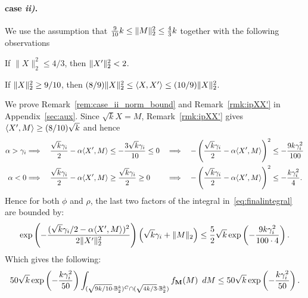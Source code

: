 \paragraph{case \textit{ii)}.}
We use the assumption that $\frac{9}{10}k\le\norm{M}_2^2\le \frac{4}{3}k$ together with the following observations
\begin{remark}\label{rem:case_ii_norm_bound}
   If $\|X\|_2^2 \leq 4/3$, then $\norm{X'}_2^2 < 2$.
\end{remark}
\begin{remark}\label{rmk:ipXX'}
    If $\norm{X}_2^2\ge 9/10$, then $(8/9)\norm{X}_2^2\le \ipr{X,X'}\le (10/9)\norm{X}_2^2$.
\end{remark}
We prove Remark~\ref{rem:case_ii_norm_bound} and Remark~\ref{rmk:ipXX'} in Appendix~\ref{sec:aux}.
Since $\sqrt{k}X = M$, Remark~\ref{rmk:ipXX'} gives $\langle X',M\rangle\ge (8/10) \sqrt{k}$ 
and hence
\begin{alignat*}{3}
    \alpha > \gamma_i 
    &\Longrightarrow\quad  \frac{\sqrt{k}\gamma_i}{2} - \alpha\langle X',M\rangle
    \le-\frac{3\sqrt{k}\gamma_i}{10}
    \le 0
    &&\Longrightarrow\quad 
    -\left(\frac{\sqrt{k}\gamma_i}{2} - \alpha\langle X',M\rangle\right)^2
    \le -\frac{9k\gamma_i^2}{100}\\
    \alpha < 0 
    &\Longrightarrow\quad
    \frac{\sqrt{k}\gamma_i}{2} - \alpha\langle X',M\rangle 
    \ge\frac{\sqrt{k}\gamma_i}{2}
    \ge 0 
    &&\Longrightarrow\quad
    -\left(\frac{\sqrt{k}\gamma_i}{2} - \alpha\langle X',M\rangle\right)^2
    \le -\frac{k\gamma_i^2}{4}.
\end{alignat*}
Hence for both $\phi$ and $\rho$, the last two factors of the integral in~\eqref{eq:finalintegral} are bounded by:
\begin{align*}
\exp\left(-\frac{(\sqrt{k}\gamma_i/2 - \alpha\ipr{X',M})^2}{2\norm{X'}_2^2}\right)\left(\sqrt{k}\gamma_i + \norm{M}_2 \right)
\le\frac{5}{2}\sqrt{k}\exp\left(-\frac{9 k\gamma_i^2}{100 \cdot 4}\right).
\end{align*}
Which gives the following:
\begin{align*}
50\sqrt{k}\exp\left(-\frac{k\gamma_i^2}{50}\right) \int_{(\sqrt{9 k/10} \cdot \mathbb{B}_2^k)^C\cap (\sqrt{4 k/3} \cdot \mathbb{B}_2^k)} f_{\mathbf{M}}(M)\enspace dM
\le 50\sqrt{k}\exp\left(-\frac{k\gamma_i^2}{50}\right).
\end{align*}

